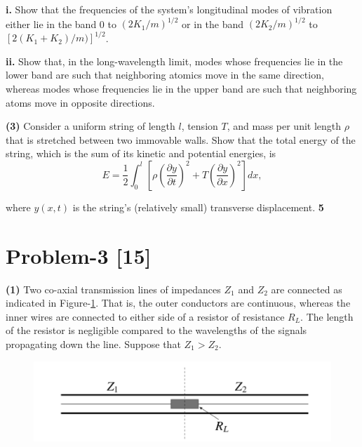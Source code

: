 \documentclass[12pt, a4paper]{article}
\begin{document}
\textbf{i.} Show that the frequencies of the system's longitudinal modes of vibration either lie in 
the band 0 to $(2K_1/m)^{1/2}$ or in the band $(2K_2/m)^{1/2}$ to $[2(K_1 + K_2)/m)]^{1/2}$.

\textbf{ii.} Show that, in the long-wavelength limit, modes whose frequencies lie in the lower band
are such that  neighboring atomics move in the same direction, whereas modes whose frequencies lie 
in the upper band are such that neighboring atoms move in opposite directions. 


\noindent
\textbf{(3)} Consider a uniform string of length $l$, tension $T$, and mass per unit length $\rho$ 
that is stretched between two immovable walls. Show that the total energy of the string, which is 
the sum of its kinetic and potential energies, is
\begin{equation*}
    E = \frac{1}{2}\int_0^l[\rho(\frac{\partial y}{\partial t})^2
+ T(\frac{\partial y}{\partial x})^2] dx,
\end{equation*}

where $y(x,t)$ is the string's (relatively small) transverse displacement. \hfill \textbf{5}

\section*{Problem-3 \hfill \textbf{[15]}}

\noindent
\textbf{(1)} Two co-axial transmission lines of impedances $Z_1$ and $Z_2$ are connected as indicated in 
Figure-\ref{fig:Transmission_with_resistor}. That is, the outer conductors are continuous, whereas the inner
wires are connected to either side of a resistor of resistance $R_L$. The length of the resistor is 
negligible compared to the wavelengths of the signals propagating down the line. Suppose that $Z_1>Z_2$. 
\begin{figure}[h]
    \centering
    \includegraphics[scale=0.4]{figs/Transmission_with_resistor.png}
    \caption{}
    \label{fig:Transmission_with_resistor}
\end{figure}
\end{document}
